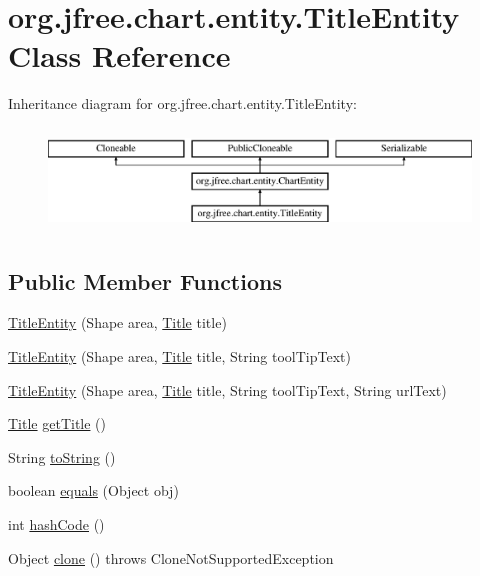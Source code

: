 \hypertarget{classorg_1_1jfree_1_1chart_1_1entity_1_1_title_entity}{}\section{org.\+jfree.\+chart.\+entity.\+Title\+Entity Class Reference}
\label{classorg_1_1jfree_1_1chart_1_1entity_1_1_title_entity}
Inheritance diagram for org.\+jfree.\+chart.\+entity.\+Title\+Entity\+:\begin{figure}[H]
\begin{center}
\leavevmode
\includegraphics[height=2.772277cm]{classorg_1_1jfree_1_1chart_1_1entity_1_1_title_entity}
\end{center}
\end{figure}
\subsection*{Public Member Functions}
\begin{DoxyCompactItemize}
\item 
\mbox{\hyperlink{classorg_1_1jfree_1_1chart_1_1entity_1_1_title_entity_abb768dd1631524ee3945d1e2eac2843c}{Title\+Entity}} (Shape area, \mbox{\hyperlink{classorg_1_1jfree_1_1chart_1_1title_1_1_title}{Title}} title)
\item 
\mbox{\hyperlink{classorg_1_1jfree_1_1chart_1_1entity_1_1_title_entity_ab8dea095e7ccf192b9918d42a10a55e7}{Title\+Entity}} (Shape area, \mbox{\hyperlink{classorg_1_1jfree_1_1chart_1_1title_1_1_title}{Title}} title, String tool\+Tip\+Text)
\item 
\mbox{\hyperlink{classorg_1_1jfree_1_1chart_1_1entity_1_1_title_entity_af158a24ff1e5b3db0d9510861c6c1955}{Title\+Entity}} (Shape area, \mbox{\hyperlink{classorg_1_1jfree_1_1chart_1_1title_1_1_title}{Title}} title, String tool\+Tip\+Text, String url\+Text)
\item 
\mbox{\hyperlink{classorg_1_1jfree_1_1chart_1_1title_1_1_title}{Title}} \mbox{\hyperlink{classorg_1_1jfree_1_1chart_1_1entity_1_1_title_entity_a9da686b4449f12559fff9d82283d6862}{get\+Title}} ()
\item 
String \mbox{\hyperlink{classorg_1_1jfree_1_1chart_1_1entity_1_1_title_entity_aa5cfaf1307f235e3a2a0d5d309a9db84}{to\+String}} ()
\item 
boolean \mbox{\hyperlink{classorg_1_1jfree_1_1chart_1_1entity_1_1_title_entity_a7caf8f584bf3d8bd68177a0805841388}{equals}} (Object obj)
\item 
int \mbox{\hyperlink{classorg_1_1jfree_1_1chart_1_1entity_1_1_title_entity_a5af263c61dcfd68d47505f198ef645d7}{hash\+Code}} ()
\item 
Object \mbox{\hyperlink{classorg_1_1jfree_1_1chart_1_1entity_1_1_title_entity_a382cdc59abaab48c9f5f669f6c067eb4}{clone}} ()  throws Clone\+Not\+Supported\+Exception 
\end{DoxyCompactItemize}



